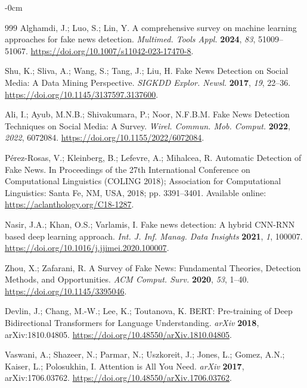 \documentclass[informatics,article,submit,pdftex,moreauthors]{Definitions/mdpi}
\begin{document}
\begin{adjustwidth}{-\extralength}{0cm}
\begin{thebibliography}{999}
Alghamdi, J.; Luo, S.; Lin, Y. A comprehensive survey on machine learning approaches for fake news detection. \textit{Multimed. Tools Appl.} \textbf{2024}, \textit{83}, 51009--51067. \href{https://doi.org/10.1007/s11042-023-17470-8}{https://doi.org/10.1007/s11042-023-17470-8}.
 
Shu, K.; Sliva, A.; Wang, S.; Tang, J.; Liu, H. Fake News Detection on Social Media: A Data Mining Perspective. \textit{SIGKDD Explor. Newsl.} \textbf{2017}, \textit{19}, 22--36. \href{https://doi.org/10.1145/3137597.3137600}{https://doi.org/10.1145/3137597.3137600}.
 
Ali, I.; Ayub, M.N.B.; Shivakumara, P.; Noor, N.F.B.M. Fake News Detection Techniques on Social Media: A Survey. \textit{Wirel. Commun. Mob. Comput.} \textbf{2022}, \textit{2022}, 6072084. \href{https://doi.org/10.1155/2022/6072084}{https://doi.org/10.1155/2022/6072084}.
 
Pérez-Rosas, V.; Kleinberg, B.; Lefevre, A.; Mihalcea, R. Automatic Detection of Fake News. In Proceedings of the 27th International Conference on Computational Linguistics (COLING 2018); Association for Computational Linguistics: Santa Fe, NM, USA, 2018; pp. 3391--3401. Available online: \href{https://aclanthology.org/C18-1287}{https://aclanthology.org/C18-1287}.
 
Nasir, J.A.; Khan, O.S.; Varlamis, I. Fake news detection: A hybrid CNN-RNN based deep learning approach. \textit{Int. J. Inf. Manag. Data Insights} \textbf{2021}, \textit{1}, 100007. \href{https://doi.org/10.1016/j.jjimei.2020.100007}{https://doi.org/10.1016/j.jjimei.2020.100007}.
 
Zhou, X.; Zafarani, R. A Survey of Fake News: Fundamental Theories, Detection Methods, and Opportunities. \textit{ACM Comput. Surv.} \textbf{2020}, \textit{53}, 1--40. \href{https://doi.org/10.1145/3395046}{https://doi.org/10.1145/3395046}.
 
Devlin, J.; Chang, M.-W.; Lee, K.; Toutanova, K. BERT: Pre-training of Deep Bidirectional Transformers for Language Understanding. \textit{arXiv} \textbf{2018}, arXiv:1810.04805. \href{https://doi.org/10.48550/arXiv.1810.04805}{https://doi.org/10.48550/arXiv.1810.04805}.
 
Vaswani, A.; Shazeer, N.; Parmar, N.; Uszkoreit, J.; Jones, L.; Gomez, A.N.; Kaiser, L.; Polosukhin, I. Attention is All You Need. \textit{arXiv} \textbf{2017}, arXiv:1706.03762. \href{https://doi.org/10.48550/arXiv.1706.03762}{https://doi.org/10.48550/arXiv.1706.03762}.
 

\end{thebibliography}
\end{adjustwidth}
\end{document}

